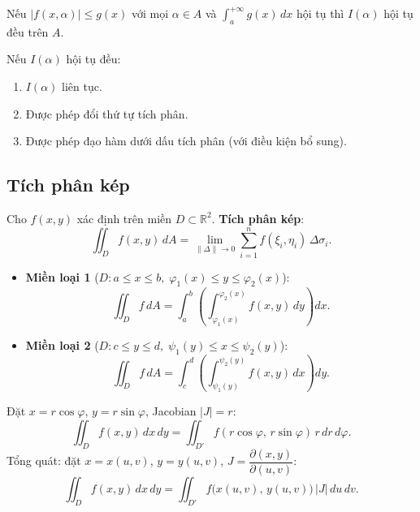 \documentclass[12pt,a4paper]{article}
\begin{document}
\begin{dinhly}[title={Tiêu chuẩn Weierstrass}]
  Nếu $|f(x, \alpha)| \le g(x)$ với mọi $\alpha \in A$ và $\displaystyle\int_a^{+\infty} g(x)\,dx$ hội tụ thì $I(\alpha)$ hội tụ đều trên $A$.
\end{dinhly}

\begin{tinhchat}
  Nếu $I(\alpha)$ hội tụ đều:
  \begin{enumerate}
    \item $I(\alpha)$ liên tục.
    \item Được phép đổi thứ tự tích phân.
    \item Được phép đạo hàm dưới dấu tích phân (với điều kiện bổ sung).
  \end{enumerate}
\end{tinhchat}

\subsection{Tích phân kép}

\begin{dinhnghia}
  Cho $f(x,y)$ xác định trên miền $D \subset \mathbb{R}^2$. \textbf{Tích phân kép}:
  \[
    \iint_D f(x,y)\,dA = \lim_{\|\Delta\| \to 0} \sum_{i=1}^{n} f(\xi_i, \eta_i)\,\Delta\sigma_i.
  \]
\end{dinhnghia}

\begin{congthuc}[title={Tính trong hệ tọa độ Descartes}]
  \begin{itemize}
    \item \textbf{Miền loại 1} ($D: a \le x \le b,\; \varphi_1(x) \le y \le \varphi_2(x)$):
      \[
        \iint_D f\,dA = \int_a^b\!\left(\int_{\varphi_1(x)}^{\varphi_2(x)} f(x,y)\,dy\right)dx.
      \]
    \item \textbf{Miền loại 2} ($D: c \le y \le d,\; \psi_1(y) \le x \le \psi_2(y)$):
      \[
        \iint_D f\,dA = \int_c^d\!\left(\int_{\psi_1(y)}^{\psi_2(y)} f(x,y)\,dx\right)dy.
      \]
  \end{itemize}
\end{congthuc}

\begin{congthuc}[title={Đổi biến - Tọa độ cực}]
  Đặt $x = r\cos\varphi$, $y = r\sin\varphi$, Jacobian $|J| = r$:
  \[
    \iint_D f(x,y)\,dx\,dy = \iint_{D'} f(r\cos\varphi,\, r\sin\varphi)\,r\,dr\,d\varphi.
  \]
  Tổng quát: đặt $x = x(u,v)$, $y = y(u,v)$, $J = \dfrac{\partial(x,y)}{\partial(u,v)}$:
  \[
    \iint_D f(x,y)\,dx\,dy = \iint_{D'} f\bigl(x(u,v),\, y(u,v)\bigr)\,|J|\,du\,dv.
  \]
\end{congthuc}
\end{document}
